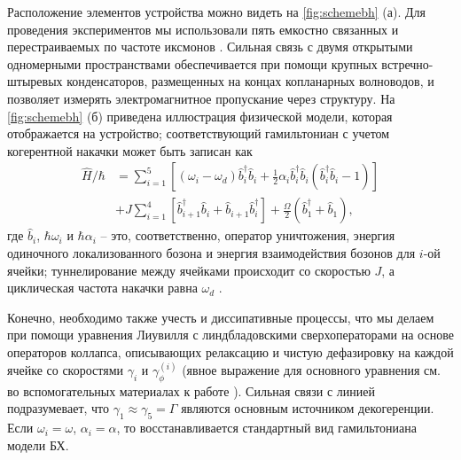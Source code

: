 \documentclass[14pt, a4paper]{extreport}
\numberwithin{equation}{section}
\begin{document}
Расположение элементов устройства можно видеть на \autoref{fig:schemebh} (а). Для проведения экспериментов мы использовали пять емкостно связанных и перестраиваемых по частоте иксмонов \cite{ma2019dissipatively, li2018perfect}. Сильная связь с двумя открытыми одномерными пространствами обеспечивается при помощи крупных встречно-штыревых конденсаторов, размещенных на концах копланарных волноводов, и позволяет измерять электромагнитное пропускание через структуру. На \autoref{fig:schemebh} (б) приведена иллюстрация физической модели, которая отображается на устройство; соответствующий гамильтониан с учетом когерентной накачки может быть записан как
\begin{equation}
\begin{aligned}
\hat H/\hbar &= \sum_{i=1}^5\left[ (\omega_i - \omega_d) \hat b^\dag_i \hat b_i + \frac{1}{2} \alpha_i \hat b_i^\dag \hat b_i (\hat b^\dag_i \hat b_i - 1)\right]\\
&+J\sum_{i=1}^4 \left[\hat b^\dag_{i+1} \hat b_i + \hat b_{i+1} \hat b_i^\dag\right]+\frac{\Omega}{2}(\hat b_1^\dag + \hat b_1),
\end{aligned}\label{eq:bose-hubbard}
\end{equation} 
где $\hat b_i$, $\hbar \omega_i$ и $\hbar \alpha_i$ -- это, соответственно, оператор уничтожения, энергия одиночного локализованного бозона и энергия взаимодействия бозонов  для $i$-ой ячейки; туннелирование между ячейками происходит со скоростью $J$, а циклическая частота накачки равна $\omega_d$ \cite{egorova2020analog, fedorov2020light, yanay2020two}.

Конечно, необходимо также учесть и диссипативные процессы, что мы делаем при помощи уравнения Лиувилля с линдбладовскими сверхоператорами на основе операторов коллапса, описывающих релаксацию и чистую дефазировку на каждой ячейке со скоростями $\gamma_i$ и $\gamma_{\phi}^{(i)}$ (явное выражение для основного уравнения см. во вспомогательных материалах к работе \cite{fedorov2021photon}). Сильная связи с линией подразумевает, что $\gamma_1 \approx \gamma_5 = \Gamma$ являются основным источником декогеренции. Если $\omega_i = \omega$, $\alpha_i = \alpha$, то восстанавливается стандартный вид гамильтониана модели БХ.
\end{document}
